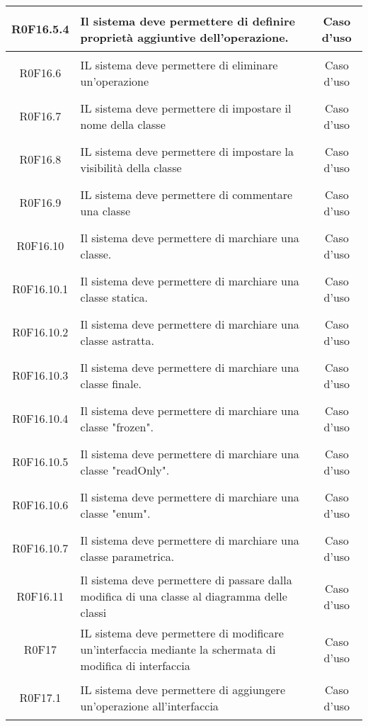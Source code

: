 \documentclass[../AnalisiDeiRequisiti.tex]{subfiles}
\begin{document}
\begin{longtable}{|c|>{\centering}p{7cm}|c|}
	\hypertarget{R0F16.5.4}{R0F16.5.4} & Il sistema deve permettere di definire proprietà aggiuntive dell'operazione. & Caso d'uso \\ \hline
	\hypertarget{R0F16.6}{R0F16.6} & IL sistema deve permettere di eliminare un'operazione  & Caso d'uso \\ \hline
	\hypertarget{R0F16.7}{R0F16.7} & IL sistema deve permettere di impostare il nome della classe & Caso d'uso \\ \hline
	\hypertarget{R0F16.8}{R0F16.8} & IL sistema deve permettere di impostare la visibilità della classe & Caso d'uso \\ \hline
	\hypertarget{R0F16.9}{R0F16.9} & IL sistema deve permettere di commentare una classe & Caso d'uso \\ \hline
	\hypertarget{R0F16.10}{R0F16.10} & Il sistema deve permettere di marchiare una classe. & Caso d'uso \\ \hline
	\hypertarget{R0F16.10.1}{R0F16.10.1} & Il sistema deve permettere di marchiare una classe statica. & Caso d'uso \\ \hline
	\hypertarget{R0F16.10.2}{R0F16.10.2} & Il sistema deve permettere di marchiare una classe astratta. & Caso d'uso \\ \hline
	\hypertarget{R0F16.10.3}{R0F16.10.3} & Il sistema deve permettere di marchiare una classe finale. & Caso d'uso \\ \hline
	\hypertarget{R0F16.10.4}{R0F16.10.4} & Il sistema deve permettere di marchiare una classe "frozen". & Caso d'uso \\ \hline
	\hypertarget{R0F16.10.5}{R0F16.10.5} & Il sistema deve permettere di marchiare una classe "readOnly". & Caso d'uso \\ \hline
	\hypertarget{R0F16.10.6}{R0F16.10.6} & Il sistema deve permettere di marchiare una classe "enum". & Caso d'uso \\ \hline
	\hypertarget{R0F16.10.7}{R0F16.10.7} & Il sistema deve permettere di marchiare una classe parametrica. & Caso d'uso \\ \hline
	\hypertarget{R0F16.11}{R0F16.11} & Il sistema deve permettere di passare dalla modifica di una classe al diagramma delle classi	 & Caso d'uso \\ \hline
	\hypertarget{R0F17}{R0F17} & IL sistema deve permettere di modificare un'interfaccia mediante la schermata di modifica di interfaccia & Caso d'uso \\ \hline
	\hypertarget{R0F17.1}{R0F17.1} & IL sistema deve permettere di aggiungere un'operazione all'interfaccia & Caso d'uso \\ \hline

\end{longtable}
\end{document}
